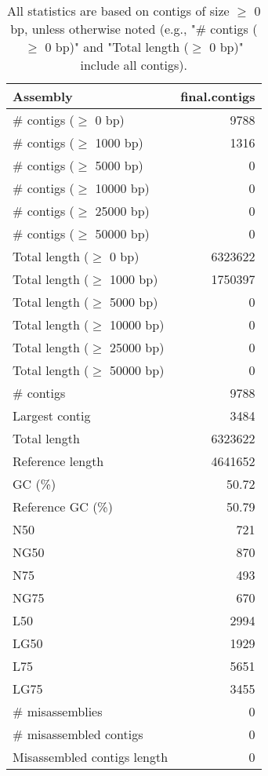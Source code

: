 \documentclass[12pt,a4paper]{article}
\begin{document}
\begin{table}[ht]
\begin{center}
\caption{All statistics are based on contigs of size $\geq$ 0 bp, unless otherwise noted (e.g., "\# contigs ($\geq$ 0 bp)" and "Total length ($\geq$ 0 bp)" include all contigs).}
\begin{tabular}{|l*{1}{|r}|}
\hline
Assembly & final.contigs \\ \hline
\# contigs ($\geq$ 0 bp) & 9788 \\ \hline
\# contigs ($\geq$ 1000 bp) & 1316 \\ \hline
\# contigs ($\geq$ 5000 bp) & 0 \\ \hline
\# contigs ($\geq$ 10000 bp) & 0 \\ \hline
\# contigs ($\geq$ 25000 bp) & 0 \\ \hline
\# contigs ($\geq$ 50000 bp) & 0 \\ \hline
Total length ($\geq$ 0 bp) & 6323622 \\ \hline
Total length ($\geq$ 1000 bp) & 1750397 \\ \hline
Total length ($\geq$ 5000 bp) & 0 \\ \hline
Total length ($\geq$ 10000 bp) & 0 \\ \hline
Total length ($\geq$ 25000 bp) & 0 \\ \hline
Total length ($\geq$ 50000 bp) & 0 \\ \hline
\# contigs & 9788 \\ \hline
Largest contig & 3484 \\ \hline
Total length & 6323622 \\ \hline
Reference length & 4641652 \\ \hline
GC (\%) & 50.72 \\ \hline
Reference GC (\%) & 50.79 \\ \hline
N50 & 721 \\ \hline
NG50 & 870 \\ \hline
N75 & 493 \\ \hline
NG75 & 670 \\ \hline
L50 & 2994 \\ \hline
LG50 & 1929 \\ \hline
L75 & 5651 \\ \hline
LG75 & 3455 \\ \hline
\# misassemblies & 0 \\ \hline
\# misassembled contigs & 0 \\ \hline
Misassembled contigs length & 0 \\ \hline

\end{tabular}
\end{center}
\end{table}
\end{document}
